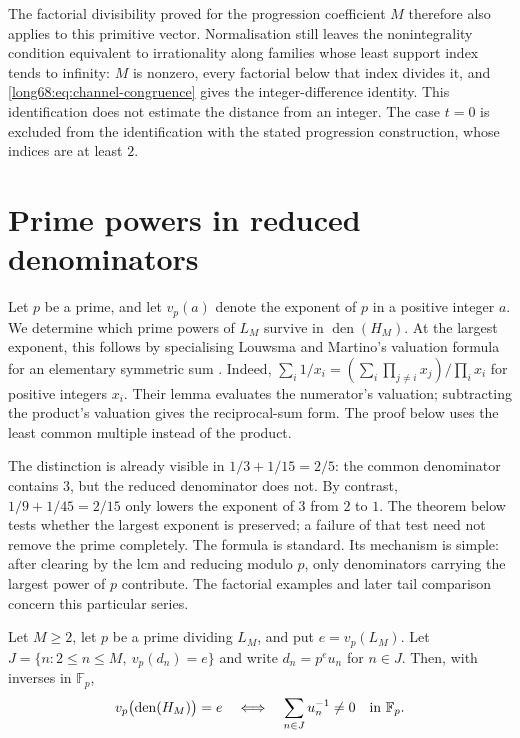 \documentclass[11pt]{article}
\newcommand{\Lc}{L}
\newcommand{\den}{\operatorname{den}}
\begin{document}
The factorial divisibility proved for the progression coefficient $M$ therefore
also applies to this primitive vector. Normalisation still leaves the
nonintegrality condition equivalent to irrationality along families
whose least support index tends to infinity: $M$ is nonzero,
every factorial below that index divides it, and
\eqref{long68:eq:channel-congruence} gives the integer-difference identity.
This identification does not estimate the distance from an integer.
The case $t=0$ is excluded from the identification with the stated
progression construction, whose indices are at least $2$.

\section{Prime powers in reduced denominators}\label{long68:sec:prime-powers}

Let $p$ be a prime, and let $v_p(a)$ denote the exponent of $p$ in a
positive integer $a$. We determine which prime powers of $\Lc_M$ survive in $\den(H_M)$.
At the largest exponent, this follows by specialising Louwsma and
Martino's valuation formula
for an elementary symmetric sum \cite[Lemma~4.1, p.~10]{louwsma-martino}.
Indeed, $\sum_i1/x_i=(\sum_i\prod_{j\ne i}x_j)/\prod_i x_i$ for positive
integers $x_i$. Their lemma evaluates the numerator's valuation; subtracting
the product's valuation gives the reciprocal-sum form. The proof below
uses the least common multiple instead of the product.

The distinction is already visible in $1/3+1/15=2/5$:
the common denominator contains $3$, but the reduced denominator does not.
By contrast, $1/9+1/45=2/15$ only lowers the exponent of $3$ from $2$ to $1$.
The theorem below tests whether the largest exponent is preserved; a
failure of that test need not remove the prime completely. The formula
is standard. Its mechanism is simple: after clearing by the lcm and
reducing modulo $p$, only denominators carrying the largest power of
$p$ contribute. The factorial examples and later tail comparison
concern this particular series.

\label{long68:res:lead-prime-pole}
\begin{theorem}\label{long68:res:prime-pole}
Let $M\ge2$, let $p$ be a prime dividing $\Lc_M$, and put $e=v_p(\Lc_M)$.
Let $J=\{n:2\le n\le M,\ v_p(d_n)=e\}$ and write $d_n=p^eu_n$ for $n\in J$.
Then, with inverses in $\mathbb F_p$,
\begin{equation}\label{long68:eq:prime-pole-survival}
 v_p\bigl(\den(H_M)\bigr)=e
 \quad\Longleftrightarrow\quad
 \sum_{n\in J}u_n^{-1}\ne0\quad\hbox{in }\mathbb F_p.
\end{equation}
\end{theorem}
\end{document}
